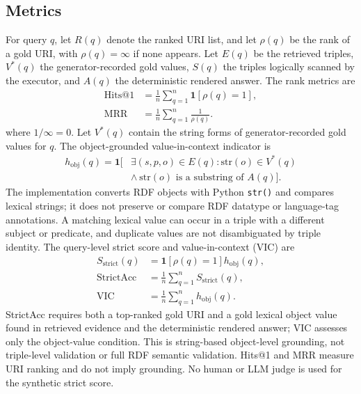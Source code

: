 \documentclass[a4paper,fleqn]{cas-dc}
\newcommand{\Sstrict}{\ensuremath{S_{\mathrm{strict}}}}
\begin{document}
\subsection{Metrics}
For query $q$, let $R(q)$ denote the ranked URI list, and let $\rho(q)$ be the rank of a gold URI, with $\rho(q)=\infty$ if none appears. Let $E(q)$ be the retrieved triples, $V^{*}(q)$ the generator-recorded gold values, $S(q)$ the triples logically scanned by the executor, and $A(q)$ the deterministic rendered answer. The rank metrics are
\begin{equation}
\begin{aligned}
\mathrm{Hits@1}&=\frac{1}{n}\sum_{q=1}^{n}\mathbf{1}[\rho(q)=1],\\
\mathrm{MRR}&=\frac{1}{n}\sum_{q=1}^{n}\frac{1}{\rho(q)}.
\end{aligned}
\label{eq:rank}
\end{equation}
where $1/\infty=0$. Let $V^{*}(q)$ contain the string forms of generator-recorded gold values for $q$. The object-grounded value-in-context indicator is
\begin{equation}
\begin{split}
h_{\mathrm{obj}}(q)=\mathbf{1}\!\big[&\exists(s,p,o)\in E(q):
\mathrm{str}(o)\in V^{*}(q)\\
&\land\ \mathrm{str}(o)\text{ is a substring of }A(q)\big].
\end{split}
\label{eq:obj}
\end{equation}
The implementation converts RDF objects with Python \texttt{str()} and compares lexical strings; it does not preserve or compare RDF datatype or language-tag annotations. A matching lexical value can occur in a triple with a different subject or predicate, and duplicate values are not disambiguated by triple identity. The query-level strict score and value-in-context (VIC) are
\begin{equation}
\begin{aligned}
\Sstrict(q)&=\mathbf{1}[\rho(q)=1]h_{\mathrm{obj}}(q),\\
\mathrm{StrictAcc}&=\frac{1}{n}\sum_{q=1}^{n}\Sstrict(q),\\
\mathrm{VIC}&=\frac{1}{n}\sum_{q=1}^{n}h_{\mathrm{obj}}(q).
\end{aligned}
\label{eq:strict}
\end{equation}
StrictAcc requires both a top-ranked gold URI and a gold lexical object value found in retrieved evidence and the deterministic rendered answer; VIC assesses only the object-value condition. This is string-based object-level grounding, not triple-level validation or full RDF semantic validation. Hits@1 and MRR measure URI ranking and do not imply grounding. No human or LLM judge is used for the synthetic strict score.
\end{document}
